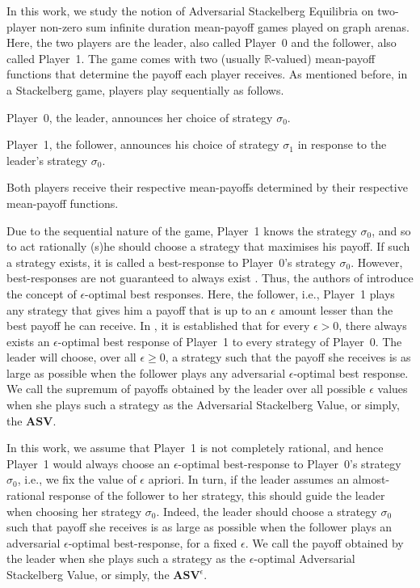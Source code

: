 In this work, we study the notion of Adversarial Stackelberg Equilibria on two-player non-zero sum infinite duration mean-payoff games played on graph arenas. Here, the two players are the leader, also called Player~0 and the follower, also called Player~1. The game comes with two (usually $\mathbb{R}$-valued) mean-payoff functions that determine the payoff each player receives. As mentioned before, in a Stackelberg game, players play sequentially as follows.
\begin{inparaenum}[(i)]
\item Player~0, the leader, announces her choice of strategy $\sigma_0$. 
\item Player~1, the follower, announces his choice of strategy $\sigma_1$ in response to the leader's strategy $\sigma_0$. 
\item Both players receive their respective mean-payoffs determined by their respective mean-payoff functions.
\end{inparaenum}
Due to the sequential nature of the game, Player~1 knows the strategy $\sigma_0$, and so to act rationally (s)he should choose a strategy that maximises his payoff. If such a strategy exists, it is called a best-response to Player~0's strategy $\sigma_0$. However, best-responses are not guaranteed to always exist \cite{FGR20}. Thus, the authors of \cite{FGR20} introduce the concept of $\epsilon$-optimal best responses. Here, the follower, i.e., Player~1  plays any strategy that gives him a payoff that is up to an $\epsilon$ amount lesser than the best payoff he can receive. In \cite{FGR20}, it is  established that for every $\epsilon > 0$, there always exists an $\epsilon$-optimal best response of Player~1 to every strategy of Player~0. The leader will choose, over all $\epsilon \geqslant 0$, a strategy such that the payoff she receives is as large as possible when the follower plays any adversarial $\epsilon$-optimal best response. We call the supremum of payoffs obtained by the leader over all possible $\epsilon$ values when she plays such a strategy as the Adversarial Stackelberg Value, or simply, the $\mathbf{ASV}$.

In this work, we assume that Player~1 is not completely rational, and hence Player~1 would always choose an $\epsilon$-optimal best-response to Player~0's strategy $\sigma_0$, i.e., we fix the value of $\epsilon$ apriori.
In turn, if the leader assumes an almost-rational response of the follower to her strategy, this should guide the leader when choosing her strategy $\sigma_0$. Indeed, the leader should choose a strategy $\sigma_0 $ such that payoff she receives is as large as possible when the follower plays an adversarial $\epsilon$-optimal best-response, for a fixed $\epsilon$. We call the payoff obtained by the leader when she plays such a strategy as the $\epsilon$-optimal Adversarial Stackelberg Value, or simply, the $\mathbf{ASV}^{\epsilon}$.

